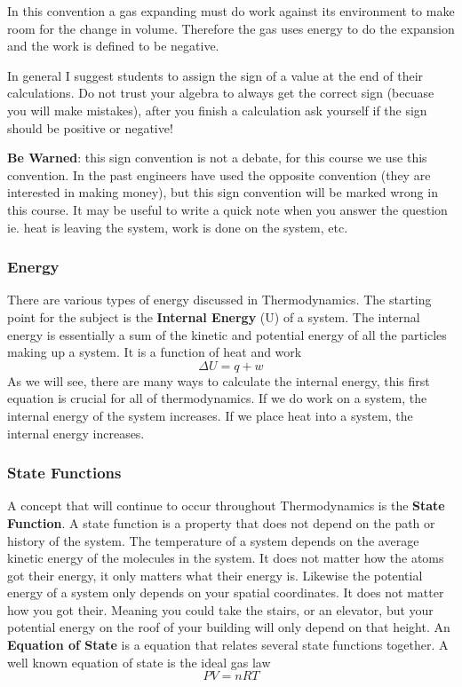 \documentclass{article}
\newcommand{\be}{\begin{equation}}
\newcommand{\ee}{\end{equation}}
\begin{document}
In this convention a gas expanding must do work against its environment to make room for the change in volume. 
Therefore the gas uses energy to do the expansion and the work is defined to be negative. 

In general I suggest students to assign the sign of a value at the end of their calculations. 
Do not trust your algebra to always get the correct sign (becuase you will make mistakes), after you finish a calculation ask yourself if the sign should be positive or negative!

\textbf{Be Warned}: this sign convention is not a debate, for this course we use this convention. 
In the past engineers have used the opposite convention (they are interested in making money), but this sign convention will be marked wrong in this course.
It may be useful to write a quick note when you answer the question ie. heat is leaving the system, work is done on the system, etc. 

\subsubsection*{Energy}
There are various types of energy discussed in Thermodynamics. 
The starting point for the subject is the \textbf{Internal Energy} (U) of a system.
The internal energy is essentially a sum of the kinetic and potential energy of  all the particles making up a system.
It is a function of heat and work
\be
\Delta U = q + w
\ee
As we will see, there are many ways to calculate the internal energy, this first equation is crucial for all of thermodynamics. 
If we do work on a system, the internal energy of the system increases. 
If we place heat into a system, the internal energy increases. 

\subsubsection*{State Functions}
A concept that will continue to occur throughout Thermodynamics is the \textbf{State Function}.
A state function is a property that does not depend on the path or history of the system. 
The temperature of a system depends on the average kinetic energy of the molecules in the system. 
It does not matter how the atoms got their energy, it only matters what their energy is. 
Likewise the potential energy of a system only depends on your spatial coordinates.
It does not matter how you got their.
Meaning you could take the stairs, or an elevator, but your potential energy on the roof of your building will only depend on that height.  
An \textbf{Equation of State} is a equation that relates several state functions together. 
A well known equation of state is the ideal gas law
\be
PV = nRT
\ee
\end{document}
